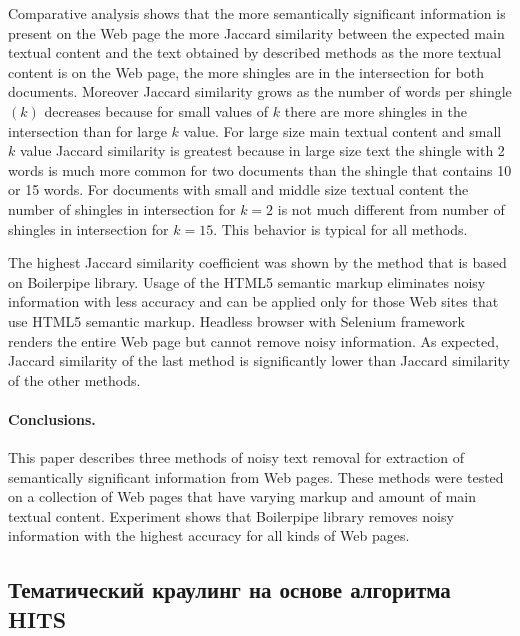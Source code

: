 Comparative analysis shows that the more semantically significant information is present on the Web page the more Jaccard similarity between the expected main textual content and the text obtained by described methods as the more textual content is on the Web page, the more shingles are in the intersection for both documents. Moreover Jaccard similarity grows as the number of words per shingle \((k)\) decreases because for small values of \(k\) there are more shingles in the intersection than for large \(k\) value. For large size main textual content and small \(k\) value Jaccard similarity is greatest because in large size text the shingle with 2 words is much more common for two documents than the shingle that contains 10 or 15 words. For documents with small and middle size textual content the number of shingles in intersection for \(k = 2\) is not much different from number of shingles in intersection for \(k = 15\). This behavior is typical for all methods.

The highest Jaccard similarity coefficient was shown by the method that is based on Boilerpipe library. Usage of the HTML5 semantic markup eliminates noisy information with less accuracy and can be applied only for those Web sites that use HTML5 semantic markup. Headless browser with Selenium framework renders the entire Web page but cannot remove noisy information. As expected, Jaccard similarity of the last method is significantly lower than Jaccard similarity of the other methods.

\paragraph{Conclusions.} This paper describes three methods of noisy text removal for extraction of semantically significant information from Web pages. These methods were tested on a collection of Web pages that have varying markup and amount of main textual content. Experiment shows that Boilerpipe library removes noisy information with the highest accuracy for all kinds of Web pages.

\subsection{Тематический краулинг на основе алгоритма HITS}\label{subsec:ch1/sec3/sub5}

